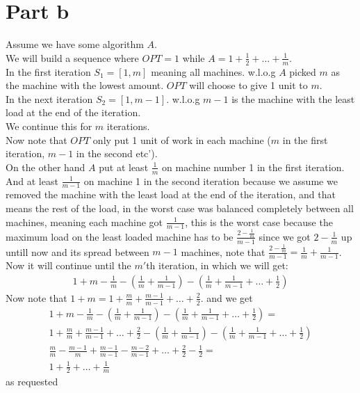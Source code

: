 \documentclass{article}
\begin{document}
\section{Part b}
Assume we have some algorithm $A$.\\
We will build a sequence where $OPT=1$ while $A=1+\frac{1}{2} +\dots+\frac{1}{m}$.\\
In the first iteration $S_1=[1,m]$ meaning all machines. w.l.o.g $A$ picked $m$ as the machine with the lowest amount. $OPT$ will choose to give 1 unit to $m$.\\
In the next iteration $S_2=[1,m-1]$. w.l.o.g $m-1$ is the machine with the least load at the end of the iteration.\\
We continue this for $m$ iterations.\\
Now note that $OPT$ only put 1 unit of work in each machine ($m$ in the first iteration, $m-1$ in the second etc').\\
On the other hand $A$ put at least $\frac{1}{m}$ on machine number 1 in the first iteration. And at least $\frac{1}{m-1}$ on machine 1 in the second iteration because we assume we removed the machine with the least load at the end of the iteration, and that means the rest of the load, in the worst case was balanced completely between all machines, meaning each machine got $\frac{1}{m-1}$, this is the worst case because the maximum load on the least loaded machine has to be $\frac{2-\frac{1}{m}}{m-1}$ since we got $2-\frac{1}{m}$ up untill now and its spread between $m-1$ machines, note that $\frac{2-\frac{1}{m}}{m-1}=\frac{1}{m} + \frac{1}{m-1}$.\\
Now it will continue until the $m'$th iteration, in which we will get:
\begin{gather*}
    1 + m - \frac{1}{m} - (\frac{1}{m} + \frac{1}{m-1})-(\frac{1}{m}+\frac{1}{m-1}+\dots+\frac{1}{2})
\end{gather*}
Now note that $1 + m= 1 + \frac{m}{m} + \frac{m-1}{m-1}+\dots+\frac{2}{2}$.
and we get 
\begin{gather*}
    1 + m - \frac{1}{m} - (\frac{1}{m} + \frac{1}{m-1})-(\frac{1}{m}+\frac{1}{m-1}+\dots+\frac{1}{2}) = \\
    1 + \frac{m}{m} + \frac{m-1}{m-1}+\dots+\frac{2}{2}- (\frac{1}{m} + \frac{1}{m-1})-(\frac{1}{m}+\frac{1}{m-1}+\dots+\frac{1}{2})\\
    \frac{m}{m} - \frac{m-1}{m} + \frac{m-1}{m-1} - \frac{m-2}{m-1}+\dots+\frac{2}{2}-\frac{1}{2} = \\
    1 + \frac{1}{2} + \dots + \frac{1}{m}
\end{gather*}
as requested
\end{document}
